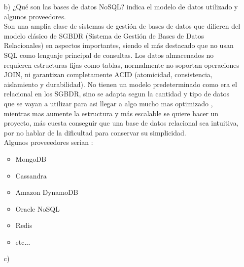 \documentclass[a4paper, 12pt]{report}
\begin{document}
\begin{enumerate}
{\begin{enumerate}
{    datos es esencial en la resolución de entidades, ya que aumenta la
    fiabilidad de las entidades resueltas y las relaciones
    detectadas.Muchos problemas que se suelen presentar en una base
    de datos se pueden solucionar con una buena calidad y manejo
    de datos. Además esto reduce costos a la larga.
}
    \item[b)]{¿Qué son las bases de datos NoSQL? indica el modelo de datos utilizado y algunos proveedores. }\\
    Son una amplia clase de sistemas de gestión de bases de datos que difieren del modelo clásico de SGBDR (Sistema de Gestión de Bases de Datos Relacionales) en aspectos importantes, siendo el más destacado que no usan SQL como lenguaje principal de consultas. Los datos almacenados no requieren estructuras fijas como tablas, normalmente no soportan operaciones JOIN, ni garantizan completamente ACID (atomicidad, consistencia, aislamiento y durabilidad). No tienen un modelo predeterminado como era el relacional en los SGBDR, sino se adapta segun la cantidad y tipo de datos que se vayan a utilizar para asi llegar a algo mucho mas optimizado , mientras mas aumente la estructura y más escalable se quiere hacer un proyecto, más cuesta conseguir que una base de datos relacional sea intuitiva, por no hablar de la dificultad para conservar su simplicidad.\\
    Algunos proveeedores serian :
    \begin{itemize}
    	\item MongoDB
    	\item Cassandra
    	\item Amazon DynamoDB
    	\item Oracle NoSQL
    	\item Redis
    	\item etc...
    \end{itemize}
   
    \item[c)]{}
\end{enumerate}
}
\end{enumerate}
\end{document}
